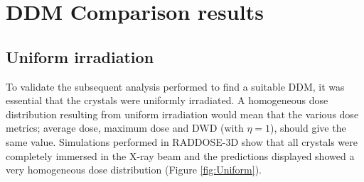 \section{DDM Comparison results}
\label{sec:DDM Comparison results}

\subsection{Uniform irradiation}
\label{sub:Uniform irradiation}

To validate the subsequent analysis performed to find a suitable DDM, it was essential that the crystals were uniformly irradiated.
A homogeneous dose distribution resulting from uniform irradiation would mean that the various dose metrics; average dose, maximum dose and DWD (with $\eta = 1$), should give the same value.
Simulations performed in RADDOSE-3D show that all crystals were completely immersed in the X-ray beam and the predictions displayed showed a very homogeneous dose distribution (Figure \ref{fig:Uniform}).
